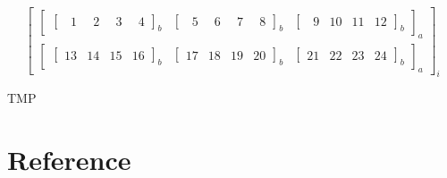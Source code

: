 \[
    \left[
        \begin{array}{c}
            \left[
                \begin{array}{ccc}
                    \left[\begin{array}{rrrr}
                                  \phantom{0}1 & \phantom{0}2 &
                                  \phantom{0}3 & \phantom{0}4
                              \end{array}\right]_{b}
                     &
                    \left[\begin{array}{rrrr}
                                  \phantom{0}5 & \phantom{0}6 &
                                  \phantom{0}7 & \phantom{0}8
                              \end{array}\right]_{b}
                     &
                    \left[\begin{array}{rrrr}
                                  \phantom{0}9 & 10 & 11 & 12
                              \end{array}\right]_{b}
                \end{array}
                \right]_{a}
            \\[12pt]
            \left[
                \begin{array}{ccc}
                    \left[\begin{array}{rrrr}
                                  13 & 14 & 15 & 16
                              \end{array}\right]_{b}
                     &
                    \left[\begin{array}{rrrr}
                                  17 & 18 & 19 & 20
                              \end{array}\right]_{b}
                     &
                    \left[\begin{array}{rrrr}
                                  21 & 22 & 23 & 24
                              \end{array}\right]_{b}
                \end{array}
                \right]_{a}
        \end{array}
        \right]_{i}
\]

TMP




\section{Reference}



